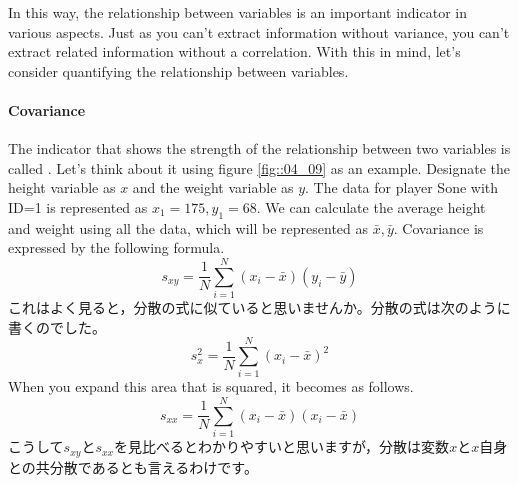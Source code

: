 \documentclass{ltjbook}
\begin{document}
In this way, the relationship between variables is an important indicator in various aspects. Just as you can't extract information without variance, you can't extract related information without a correlation. With this in mind, let's consider quantifying the relationship between variables.

\paragraph{Covariance} The indicator that shows the strength of the relationship between two variables is called . Let's think about it using figure \ref{fig::04_09} as an example. Designate the height variable as $x$ and the weight variable as $y$. The data for player Sone with ID=1 is represented as $x_1= 175, y_1=68$. We can calculate the average height and weight using all the data, which will be represented as $\bar{x},\bar{y}$. Covariance is expressed by the following formula.
\[ s_{xy} = \frac{1}{N}\sum_{i=1}^N (x_i - \bar{x})(y_i - \bar{y})\]
これはよく見ると，分散の式に似ていると思いませんか。分散の式は次のように書くのでした。
\[ s_{x}^2 = \frac{1}{N}\sum_{i=1}^N (x_i - \bar{x})^2 \]
When you expand this area that is squared, it becomes as follows.
\[ s_{xx} = \frac{1}{N}\sum_{i=1}^N (x_i - \bar{x})(x_i - \bar{x}) \]
こうして$s_{xy}$と$s_{xx}$を見比べるとわかりやすいと思いますが，分散は変数$x$と$x$自身との共分散であるとも言えるわけです。
\end{document}
